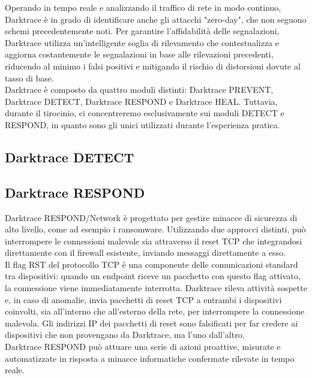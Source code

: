 \documentclass[12pt,a4paper,oneside,onecolumn,openright]{book}
\begin{document}
Operando in tempo reale e analizzando il traffico di rete in modo continuo, Darktrace 
è in grado di identificare anche gli attacchi "zero-day", che non seguono schemi precedentemente 
noti. Per garantire l'affidabilità delle segnalazioni, Darktrace utilizza un'intelligente 
soglia di rilevamento che contestualizza e aggiorna costantemente le segnalazioni in 
base alle rilevazioni precedenti, riducendo al minimo i falsi positivi e mitigando il 
rischio di distorsioni dovute al tasso di base.\\

Darktrace è composto da quattro moduli distinti: Darktrace PREVENT, Darktrace DETECT, 
Darktrace RESPOND e Darktrace HEAL. Tuttavia, durante il tirocinio, ci concentreremo 
esclusivamente sui moduli DETECT e RESPOND, in quanto sono gli unici utilizzati durante 
l'esperienza pratica.

\subsection{Darktrace DETECT}
\subsection{Darktrace RESPOND}
Darktrace RESPOND/Network è progettato per gestire minacce di sicurezza di alto livello, 
come ad esempio i ransomware. Utilizzando due approcci distinti, può interrompere le 
connessioni malevole sia attraverso il reset TCP che integrandosi direttamente con 
il firewall esistente, inviando messaggi direttamente a esso.\\

Il flag RST del protocollo TCP è una componente delle comunicazioni standard tra 
dispositivi: quando un endpoint riceve un pacchetto con questo flag attivato, 
la connessione viene immediatamente interrotta. Darktrace rileva attività sospette e, 
in caso di anomalie, invia pacchetti di reset TCP a entrambi i dispositivi coinvolti, 
sia all'interno che all'esterno della rete, per interrompere la connessione malevola. 
Gli indirizzi IP dei pacchetti di reset sono falsificati per far credere ai dispositivi 
che non provengano da Darktrace, ma l'uno dall'altro.\\

Darktrace RESPOND può attuare una serie di azioni proattive, misurate e automatizzate 
in risposta a minacce informatiche confermate rilevate in tempo reale.\\
\end{document}
